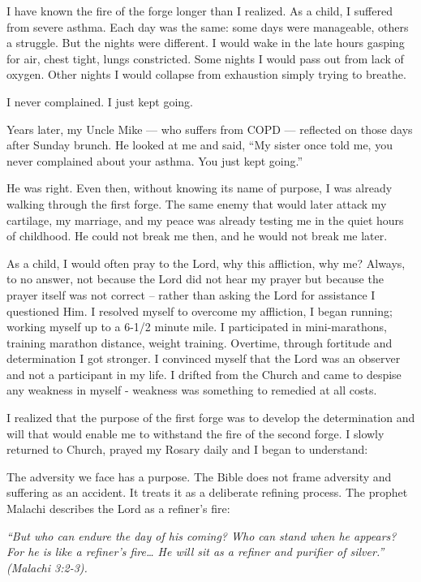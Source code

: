 \documentclass[12pt,a4paper]{book}
\begin{document}
I have known the fire of the forge longer than I realized.  As a child, I suffered from severe asthma. Each day was the same: some days were manageable, others a struggle.  But the nights were different.  I would wake in the late hours gasping for air, chest tight, lungs constricted.  Some nights I would pass out from lack of oxygen. Other nights I would collapse from exhaustion simply trying to breathe.

I never complained.  I just kept going.

Years later, my Uncle Mike — who suffers from COPD — reflected on those days after Sunday brunch.  He looked at me and said, “My sister once told me, you never complained about your asthma. You just kept going.”

He was right.  Even then, without knowing its name of purpose, I was already walking through the first forge.  The same enemy that would later attack my cartilage,  my marriage,  and my peace was already testing me in the quiet hours of childhood.  He could not break me then, and he would not break me later. 
 
As a child, I would often pray to the Lord, why this affliction, why me?  Always, to no answer, not because the Lord did not hear my prayer but because the prayer itself was not correct -- rather than asking the Lord for assistance I questioned Him.  I resolved myself to overcome my affliction, I began running; working myself up to a 6-1/2 minute mile.  I participated in mini-marathons, training marathon distance, weight training.  Overtime, through fortitude and determination I got stronger.  I convinced myself that the Lord was an observer and not a participant in my life.  I drifted from the Church and came to despise any weakness in myself - weakness was something to remedied at all costs.

I realized that the purpose of the first forge was to develop the determination and will that would enable me to withstand the fire of the second forge.  I slowly returned to Church, prayed my Rosary daily and I began to understand:

The adversity we face has a purpose.  The Bible does not frame adversity and suffering as an accident.  It treats it as a deliberate refining process.  The prophet Malachi describes the Lord as a refiner's fire:
 
\textit{“But who can endure the day of his coming? Who can stand when he appears? For he is like a refiner’s fire… He will sit as a refiner and purifier of silver.” (Malachi 3:2-3).}
\end{document}
